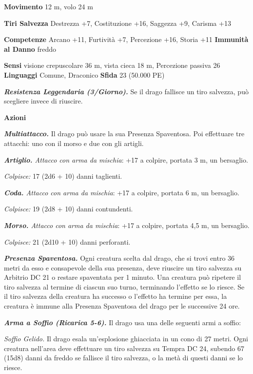 \begin{multicols}{2}
\textbf{Movimento} 12 m, volo 24 m

\textbf{Tiri Salvezza} Destrezza +7, Costituzione +16, Saggezza +9,
Carisma +13

\textbf{Competenze} Arcano +11, Furtività +7, Percezione +16, Storia +11
\textbf{Immunità al Danno} freddo

\textbf{Sensi} visione crepuscolare 36 m, vista cieca 18 m, Percezione passiva
26 \textbf{Linguaggi} Comune, Draconico \textbf{Sfida} 23 (50.000 PE)\smallskip

\emph{\textbf{Resistenza Leggendaria (3/Giorno).}} Se il drago fallisce
un tiro salvezza, può scegliere invece di riuscire.

\smallskip\textbf{Azioni}

\emph{\textbf{Multiattacco.}} Il drago può usare la sua Presenza
Spaventosa. Poi effettuare tre attacchi: uno con il morso e due con gli
artigli.

\emph{\textbf{Artiglio.} Attacco con arma da mischia}: +17 a colpire,
portata 3 m, un bersaglio.

\emph{Colpisce:} 17 (2d6 + 10) danni taglienti.

\emph{\textbf{Coda.} Attacco con arma da mischia}: +17 a colpire,
portata 6 m, un bersaglio.

\emph{Colpisce:} 19 (2d8 + 10) danni contundenti.

\emph{\textbf{Morso.} Attacco con arma da mischia}: +17 a colpire,
portata 4,5 m, un bersaglio.

\emph{Colpisce:} 21 (2d10 + 10) danni perforanti.

\emph{\textbf{Presenza Spaventosa.}} Ogni creatura scelta dal drago, che
si trovi entro 36 metri da esso e consapevole della sua presenza, deve
riuscire un tiro salvezza su Arbitrio DC 21 o restare spaventata per 1
minuto. Una creatura può ripetere il tiro salvezza al termine di ciascun
suo turno, terminando l'effetto se lo riesce. Se il tiro salvezza della
creatura ha successo o l'effetto ha termine per essa, la creatura è
immune alla Presenza Spaventosa del drago per le successive 24 ore.

\emph{\textbf{Arma a Soffio (Ricarica 5-6).}} Il drago usa una delle
seguenti armi a soffio:

\emph{Soffio Gelido.} Il drago esala un'esplosione ghiacciata in un cono
di 27 metri. Ogni creatura nell'area deve effettuare un tiro salvezza su Tempra DC 24, subendo 67 (15d8) danni da freddo se fallisce il
tiro salvezza, o la metà di questi danni se lo riesce.


\end{multicols}
